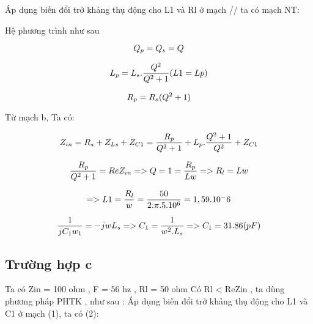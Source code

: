 \documentclass{article}
\begin{document}
Áp dụng biến đổi trở khảng  thụ động cho L1 và Rl ở mạch // ta có mạch NT:







Hệ phương trình như sau 

\begin{equation}
\Large
Q_{p} = Q_{s} = Q
\end{equation}

\begin{equation}
\Large
L_{p} = L_{s} . \frac{Q^2}{Q^2+1}(L1=Lp)
\end{equation}

\begin{equation}
\Large
 R_{p} = R_{s} (Q^2+1)
\end{equation}

Từ mạch b, Ta có:

\begin{equation}
\Large
Z_{in} = R_{s} + Z_{Ls} + Z_{C1} = \frac{R_{p}}{Q^2+1} + L_{p}.\frac{Q^2+1}{Q^2} + Z_{C1} 
\end{equation}

\begin{equation}
\Large
\frac{R_{p}}{Q^2+1} = Re{Z_{in}} =>  Q = 1 = \frac{R_{p}}{Lw} => R_{l} = Lw
\end{equation}

\begin{equation}
\Large
=> L1 = \frac{R_{l}}{w} = \frac{50}{2.\pi.5.10^6} = 1,59 . 10^-6
\end{equation}


\begin{equation}
\Large
\frac{1}{jC_{1}w_{1}} = -jwL_{s} => C_{1} = \frac{1}{w^2.L_{s}} => C_{1} = 31.86 (pF)
\end{equation}




\subsection{Trường hợp c}
Ta có Zin = 100 ohm , F = 56 hz , Rl = 50 ohm 
Có Rl < Re{Zin} , ta dùng phương pháp PHTK , như sau :
Áp dụng biến đổi trở khảng  thụ động cho L1 và C1 ở mạch (1), ta có (2):
\end{document}
